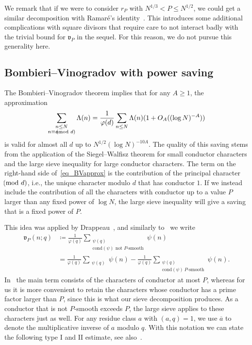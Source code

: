 \documentclass[12pt]{amsart}
\theoremstyle{definition}
\theoremstyle{remark}
\numberwithin{equation}{section}
\newcommand{\1}{\mathbf{1}}
\let\oldpmod\pmod
\renewcommand{\pmod}[1]{\hspace{-0.12cm}\oldpmod {#1}}
\begin{document}
We remark that if we were to consider $r_P$ with $N^{1/3}<P\leq N^{1/2}$, we could get a similar decomposition with Ramar\'e's identity~\cite[eq. (17.9)]{cribro}. This introduces some additional complications with square divisors that require care to not interact badly with the trivial bound for $\mathfrak{v}_P$ in the sequel. For this reason, we do not pursue this generality here. 



\subsection{Bombieri--Vinogradov with power saving}
The Bombieri--Vinogradov theorem implies that for any $A\geq 1$, the approximation
\begin{align}\label{eq_BVapprox}
\sum_{\substack{n\leq N \\ n\equiv a\pmod d}}\Lambda(n)=\frac{1}{\varphi(d)}\sum_{n\leq N}\Lambda(n)(1+O_A((\log N)^{-A}))
\end{align}
is valid for almost all $d$ up to $N^{1/2}(\log N)^{-10A}$. The quality of this saving stems from the application of the Siegel--Walfisz theorem for small conductor characters and the large sieve inequality for large conductor characters. The term on the right-hand side of~\eqref{eq_BVapprox} is the contribution of the principal character $\pmod{d}$, i.e., the unique character modulo $d$ that has conductor $1$. If we instead include the contribution of all the characters with conductor up to a value $P$ larger than any fixed power of $\log N$, the large sieve inequality will give a saving that is a fixed power of $P$.


This idea was applied by Drappeau~\cite{drappeau}, and similarly to~\cite[equation (5.1)]{drappeau} we write
\begin{align}\label{eq_uPdef}
\mathfrak{v}_P(n;q)&\coloneqq  \frac{1}{\varphi(q)}\sum_{\substack{\psi(q)\\ \text{cond}(\psi)\text{ not }P\text{-smooth}}}\psi(n)\\
&=	\frac{1}{\varphi(q)}\sum_{\substack{\psi(q)}}\psi(n)-\frac{1}{\varphi(q)}\sum_{\substack{\psi(q)\\ \text{cond}(\psi)\ P\text{-smooth}}}\psi(n). \nonumber
\end{align}
In~\cite{drappeau} the main term consists of the characters of conductor at most $P$, whereas for us it is more convenient to retain the characters whose conductor has a prime factor larger than $P$, since this is what our sieve decomposition produces. As a conductor that is not $P$-smooth exceeds $P$, the large sieve applies to these characters just as well.
For any residue class $a$ with $(a,q)=1$, we use $\overline{a}$ to denote the multiplicative inverse of $a$ modulo $q$. With this notation we can state the following type I and II estimate, see also~\cite[Lemma 5.2]{drappeau}.
\end{document}
